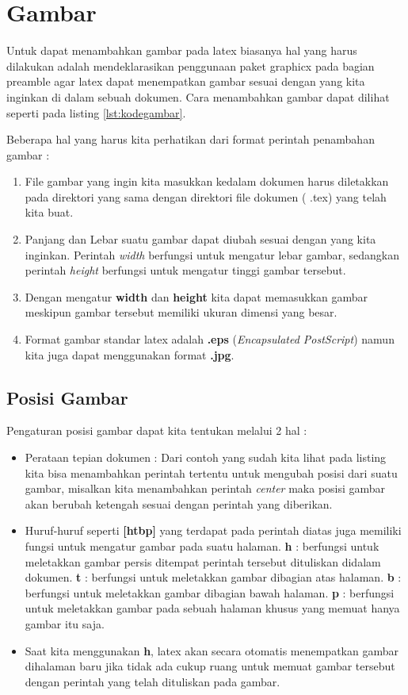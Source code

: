 \section{Gambar}
Untuk dapat menambahkan gambar pada latex biasanya hal yang harus dilakukan adalah mendeklarasikan penggunaan paket graphicx pada bagian preamble agar latex dapat menempatkan gambar sesuai dengan yang kita inginkan di dalam sebuah dokumen. Cara menambahkan gambar dapat dilihat seperti pada listing \ref{lst:kodegambar}.

Beberapa hal yang harus kita perhatikan dari format perintah penambahan gambar :
\begin{enumerate}
\item File gambar yang ingin kita masukkan kedalam dokumen harus diletakkan pada direktori yang sama dengan direktori file dokumen ( .tex) yang telah kita buat.
\item Panjang dan Lebar suatu gambar dapat diubah sesuai dengan yang kita inginkan. Perintah \textit{width} berfungsi untuk mengatur lebar gambar, sedangkan perintah \textit{height} berfungsi untuk mengatur tinggi gambar tersebut.
\item Dengan mengatur \textbf{width} dan \textbf{height} kita dapat memasukkan gambar meskipun gambar tersebut memiliki ukuran dimensi yang besar.
\item Format gambar standar latex adalah \textbf{ .eps} (\textit{Encapsulated PostScript}) namun kita juga dapat menggunakan format \textbf{ .jpg}.
\end{enumerate}
\subsection{Posisi Gambar}
Pengaturan posisi gambar dapat kita tentukan melalui 2 hal : 
\begin{itemize}
\item Perataan tepian dokumen : Dari contoh yang sudah kita lihat pada listing kita bisa menambahkan perintah tertentu untuk mengubah posisi dari suatu gambar, misalkan kita menambahkan perintah \textit{center} maka posisi gambar akan berubah ketengah sesuai dengan perintah yang diberikan.
\item Huruf-huruf seperti \textbf{[htbp]} yang terdapat pada perintah diatas juga memiliki fungsi untuk mengatur gambar pada suatu halaman.
\subitem \textbf{h} : berfungsi untuk meletakkan gambar persis ditempat perintah tersebut dituliskan didalam dokumen.
\subitem \textbf{t} : berfungsi untuk meletakkan gambar dibagian atas halaman.
\subitem \textbf{b} : berfungsi untuk meletakkan gambar dibagian bawah halaman.
\subitem \textbf{p} : berfungsi untuk meletakkan gambar pada sebuah halaman khusus yang memuat hanya gambar itu saja.
\item Saat kita menggunakan \textbf{h}, latex akan secara otomatis menempatkan gambar dihalaman baru jika tidak ada cukup ruang untuk memuat gambar tersebut dengan perintah yang telah dituliskan pada gambar.
\end{itemize}